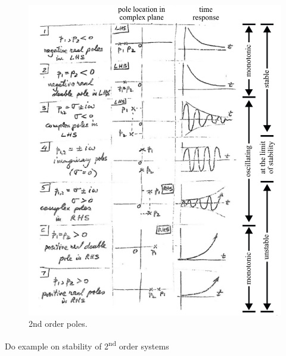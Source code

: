 \documentclass[12pt,letter]{article}
\begin{document}
\begin{figure}[H]
	\centering
	\includegraphics[width=6.5in]{../figures/2nd_order_poles}
	\caption{2nd order poles.}
\end{figure}



\begin{example}
Do example on stability of 2\textsuperscript{nd} order systems
\end{example}

%
%	
%	
%
%
%
\end{document}
